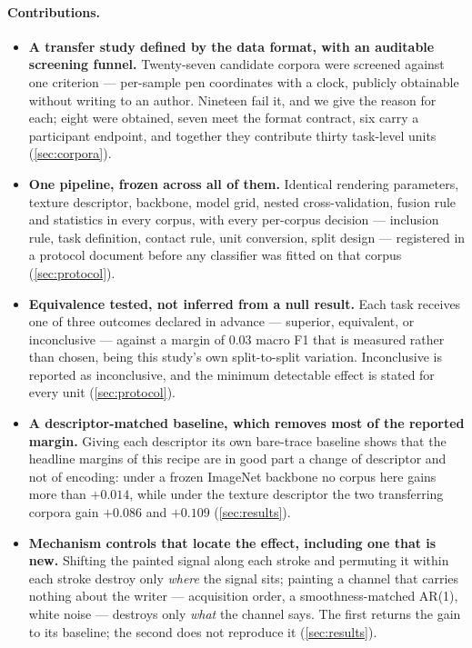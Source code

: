 \paragraph{Contributions.}
\begin{itemize}
\itemsep0em

\item \textbf{A transfer study defined by the data format, with an auditable screening funnel.}
Twenty-seven candidate corpora were screened against one criterion --- per-sample pen coordinates
with a clock, publicly obtainable without writing to an author. Nineteen fail it, and we give the
reason for each; eight were obtained, seven meet the format contract, six carry a participant
endpoint, and together they contribute thirty task-level units (\cref{sec:corpora}).

\item \textbf{One pipeline, frozen across all of them.} Identical rendering parameters, texture
descriptor, backbone, model grid, nested cross-validation, fusion rule and statistics in every
corpus, with every per-corpus decision --- inclusion rule, task definition, contact rule, unit
conversion, split design --- registered in a protocol document before any classifier was fitted on
that corpus (\cref{sec:protocol}).

\item \textbf{Equivalence tested, not inferred from a null result.} Each task receives one of three
outcomes declared in advance --- superior, equivalent, or inconclusive --- against a margin of
$0.03$ macro F1 that is measured rather than chosen, being this study's own split-to-split
variation. Inconclusive is reported as inconclusive, and the minimum detectable effect is stated
for every unit (\cref{sec:protocol}).

\item \textbf{A descriptor-matched baseline, which removes most of the reported margin.} Giving
each descriptor its own bare-trace baseline shows that the headline margins of this recipe are in
good part a change of descriptor and not of encoding: under a frozen ImageNet backbone no corpus
here gains more than $+0.014$, while under the texture descriptor the two transferring corpora gain
$+0.086$ and $+0.109$ (\cref{sec:results}).

\item \textbf{Mechanism controls that locate the effect, including one that is new.} Shifting the
painted signal along each stroke and permuting it within each stroke destroy only \emph{where} the
signal sits; painting a channel that carries nothing about the writer --- acquisition order, a
smoothness-matched AR(1), white noise --- destroys only \emph{what} the channel says. The first
returns the gain to its baseline; the second does not reproduce it (\cref{sec:results}).


\end{itemize}
